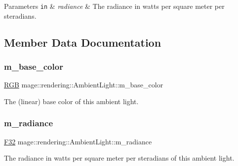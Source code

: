 \begin{DoxyParams}[1]{Parameters}
\mbox{\tt in}  & {\em radiance} & The radiance in watts per square meter per steradians. \\
\hline
\end{DoxyParams}


\subsection{Member Data Documentation}
\mbox{\label{classmage_1_1rendering_1_1_ambient_light_a28527ee932d424f43686c1abe9c0f3ec}} 
\subsubsection{\texorpdfstring{m\+\_\+base\+\_\+color}{m\_base\_color}}
{\footnotesize\ttfamily \mbox{\hyperlink{structmage_1_1_r_g_b}{R\+GB}} mage\+::rendering\+::\+Ambient\+Light\+::m\+\_\+base\+\_\+color\hspace{0.3cm}{\ttfamily [private]}}

The (linear) base color of this ambient light. \mbox{\label{classmage_1_1rendering_1_1_ambient_light_adfdafe01958a72df46eeb3c0f5f0d0c4}} 
\subsubsection{\texorpdfstring{m\+\_\+radiance}{m\_radiance}}
{\footnotesize\ttfamily \mbox{\hyperlink{namespacemage_aa97e833b45f06d60a0a9c4fc22ae02c0}{F32}} mage\+::rendering\+::\+Ambient\+Light\+::m\+\_\+radiance\hspace{0.3cm}{\ttfamily [private]}}

The radiance in watts per square meter per steradians of this ambient light. 